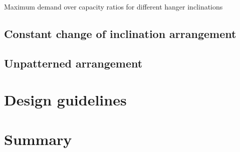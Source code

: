\begin{table}[H]
    \centering
    \caption{Maximum demand over capacity ratios for different hanger inclinations}
    \label{tab:cost_inclination}
    
\end{table}


\subsection{Constant change of inclination arrangement}

\subsection{Unpatterned arrangement}


\section{Design guidelines}


\section{Summary}











